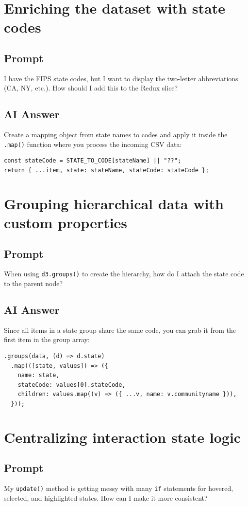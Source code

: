 \documentclass[11pt]{article}
\begin{document}
\section{Enriching the dataset with state codes}
\subsection*{Prompt}
I have the FIPS state codes, but I want to display the two-letter abbreviations (CA, NY, etc.). How should I add this to the Redux slice?

\subsection*{AI Answer}
Create a mapping object from state names to codes and apply it inside the \texttt{.map()} function where you process the incoming CSV data:
\begin{Verbatim}[fontsize=\small]
const stateCode = STATE_TO_CODE[stateName] || "??";
return { ...item, state: stateName, stateCode: stateCode };
\end{Verbatim}

\section{Grouping hierarchical data with custom properties}
\subsection*{Prompt}
When using \texttt{d3.groups()} to create the hierarchy, how do I attach the state code to the parent node?

\subsection*{AI Answer}
Since all items in a state group share the same code, you can grab it from the first item in the group array:
\begin{Verbatim}[fontsize=\small]
.groups(data, (d) => d.state)
  .map(([state, values]) => ({
    name: state,
    stateCode: values[0].stateCode,
    children: values.map((v) => ({ ...v, name: v.communityname })),
  }));
\end{Verbatim}

\section{Centralizing interaction state logic}
\subsection*{Prompt}
My \texttt{update()} method is getting messy with many \texttt{if} statements for hovered, selected, and highlighted states. How can I make it more consistent?
\end{document}
